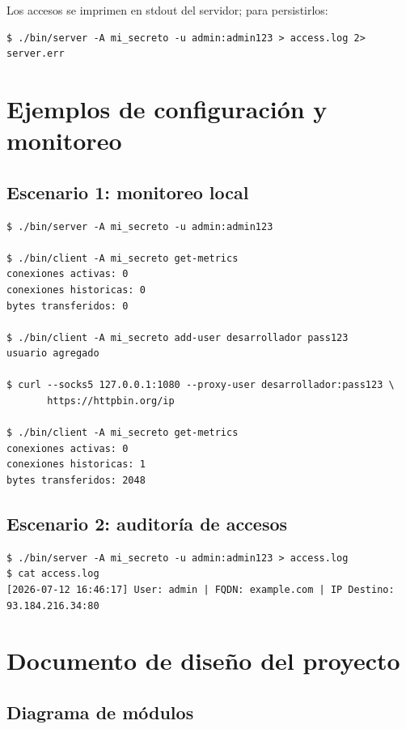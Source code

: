 \documentclass[12pt,a4paper]{article}
\begin{document}
Los accesos se imprimen en stdout del servidor; para persistirlos:

\begin{lstlisting}
$ ./bin/server -A mi_secreto -u admin:admin123 > access.log 2> server.err
\end{lstlisting}

\section{Ejemplos de configuración y monitoreo}

\subsection{Escenario 1: monitoreo local}

\begin{lstlisting}
$ ./bin/server -A mi_secreto -u admin:admin123

$ ./bin/client -A mi_secreto get-metrics
conexiones activas: 0
conexiones historicas: 0
bytes transferidos: 0

$ ./bin/client -A mi_secreto add-user desarrollador pass123
usuario agregado

$ curl --socks5 127.0.0.1:1080 --proxy-user desarrollador:pass123 \
       https://httpbin.org/ip

$ ./bin/client -A mi_secreto get-metrics
conexiones activas: 0
conexiones historicas: 1
bytes transferidos: 2048
\end{lstlisting}

\subsection{Escenario 2: auditoría de accesos}

\begin{lstlisting}
$ ./bin/server -A mi_secreto -u admin:admin123 > access.log
$ cat access.log
[2026-07-12 16:46:17] User: admin | FQDN: example.com | IP Destino: 93.184.216.34:80
\end{lstlisting}

\section{Documento de diseño del proyecto}

\subsection{Diagrama de módulos}
\end{document}

